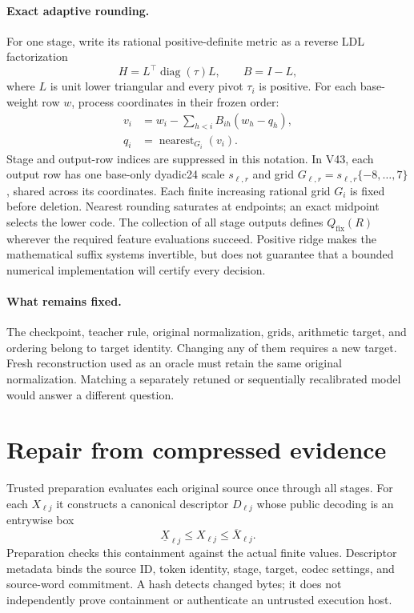 \documentclass[10pt,twocolumn,letterpaper]{article}
\newcommand{\Qfix}{Q_{\mathrm{fix}}}
\begin{document}
\paragraph{Exact adaptive rounding.}
For one stage, write its rational positive-definite metric as a reverse LDL
factorization
\[
 H=L^\top\operatorname{diag}(\tau)L,
 \qquad B=I-L,
\]
where $L$ is unit lower triangular and every pivot $\tau_i$ is positive. For each
base-weight row $w$, process coordinates in their frozen order:
\begin{align}
 v_i&=w_i-\sum_{h<i} B_{ih}(w_h-q_h),\label{eq:recurrence}\\
 q_i&=\operatorname{nearest}_{G_i}(v_i).
 \label{eq:rounding}
\end{align}
Stage and output-row indices are suppressed in this notation. In V43, each
output row has one base-only dyadic24 scale $s_{\ell,r}$ and grid
$G_{\ell,r}=s_{\ell,r}\{-8,\ldots,7\}$, shared across its coordinates.
Each finite increasing rational grid $G_i$ is fixed before deletion. Nearest
rounding saturates at endpoints; an exact midpoint selects the lower code. The
collection of all stage outputs defines $\Qfix(R)$ wherever the required feature
evaluations succeed. Positive ridge makes the mathematical suffix systems
invertible, but does not guarantee that a bounded numerical implementation will
certify every decision.

\paragraph{What remains fixed.}
The checkpoint, teacher rule, original normalization, grids, arithmetic target, and
ordering belong to target identity. Changing any of them requires a new target.
Fresh reconstruction used as an oracle must retain the same original
normalization. Matching a separately retuned or sequentially recalibrated model
would answer a different question.

\section{Repair from compressed evidence}
\label{sec:method}
Trusted preparation evaluates each original source once through all stages.
For each $X_{\ell j}$ it constructs a canonical descriptor $D_{\ell j}$ whose
public decoding is an entrywise box
\begin{equation}
 \underline X_{\ell j}\leq X_{\ell j}\leq\overline X_{\ell j}.
 \label{eq:containment}
\end{equation}
Preparation checks this containment against the actual finite values. Descriptor
metadata binds the source ID, token identity, stage, target, codec settings, and
source-word commitment. A hash detects changed bytes; it does not independently
prove containment or authenticate an untrusted execution host.
\end{document}

